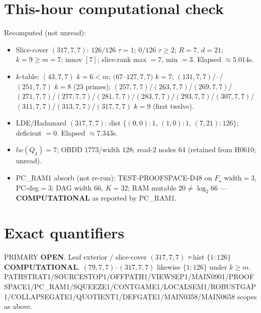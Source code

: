 \documentclass[11pt]{article}
\begin{document}
\section*{This-hour computational check}
Recomputed (not unread):
\begin{itemize}
\item Slice-cover $(317,7,7)$: $126/126$ $\tau{=}1$; $0/126$ $\tau{\ge}2$; $R{=}7$, $d{=}21$;
  $k{=}9{\ge}m{=}7$; innov $[7]$; slice-rank max $=7$, min $=3$. Elapsed $\approx5.014$s.
\item $k$-table: $(43,7,7)$ $k{=}6{<}m$; $(67$--$127,7,7)$ $k{=}7$;
  $(131,7,7)$/--/$(251,7,7)$ $k{=}8$ (23 primes); $(257,7,7)$/$(263,7,7)$/$(269,7,7)$/$(271,7,7)$/$(277,7,7)$/$(281,7,7)$/$(283,7,7)$/$(293,7,7)$/$(307,7,7)$/$(311,7,7)$/$(313,7,7)$/$(317,7,7)$ $k{=}9$ (first twelve).
\item LDE/Hadamard $(317,7,7)$: dist $\{(0,0){:}1,\,(1,0){:}1,\,(7,21){:}126\}$; deficient $=0$. Elapsed $\approx7.343$s.
\item $lw(Q_4)=7$; OBDD $1773$/width $128$; read-$2$ nodes $64$ (retained from H0610; unread).
\item PC\_RAM1 absorb (not re-run): TEST-PROOFSPACE-D48 on $F_\star$ width$=3$, PC-deg$=3$;
  DAG width $66$, $K=32$; RAM mutable $20\neq\log_2 66$ --- \textbf{COMPUTATIONAL} as reported by PC\_RAM1.
\end{itemize}

\section*{Exact quantifiers}
PRIMARY \textbf{OPEN}. Leaf exterior / slice-cover $(317,7,7)$ $\tau$-hist $\{1{:}126\}$ \textbf{COMPUTATIONAL}.
$(79,7,7)$--$(317,7,7)$ likewise $\{1{:}126\}$ under $k{\ge}m$.
PATHSTRAT1/SOURCESTOP1/OFFPATH1/VIEWSEP1/MAIN0901/PROOFSPACE1/PC\_RAM1/SQUEEZE1/CONTGAME1/LOCALSEM1/ROBUSTGAP1/COLLAPSEGATE1/QUOTIENT1/DEFGATE1/MAIN0358/MAIN0658 scopes as above.
\end{document}
